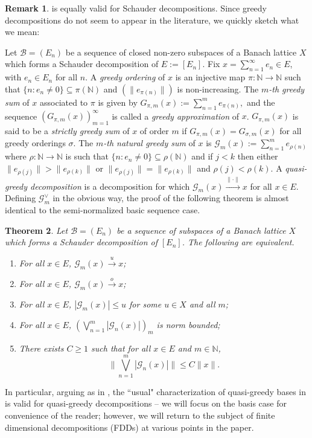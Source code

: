 \documentclass[12pt,leqno]{amsart}
\newtheorem{theorem}{Theorem}[section]
\numberwithin{equation}{section}
\theoremstyle{definition}
\newtheorem{remark}[theorem]{Remark}
\newcommand{\term}[1]{{\textit{#1}}}   %
\def\N{{\mathbb N}}
\begin{document}
\begin{remark}\label{Recall FDD}
  is equally valid for Schauder decompositions. Since greedy decompositions do not seem to appear in the literature, we quickly sketch what we mean:
\medskip

Let $\mathcal{B}=(E_n)$ be a sequence of closed non-zero subspaces of a Banach lattice $X$ which forms a Schauder  decomposition of $E:=[E_n].$  Fix $x=\sum_{n=1}^\infty e_n \in E$, with $e_n\in E_n$ for all $n$. A \term{greedy ordering} of $x$ is an injective map $\pi : \mathbb{N}\to \mathbb{N}$ such that $\{n: e_n\neq 0\}\subseteq \pi(\mathbb{N})$ and  $(\|e_{\pi(n)}\|)$ is non-increasing. The \term{$m$-th greedy sum} of $x$ associated to $\pi$ is given by $G_{\pi,m}(x):=\sum_{n=1}^m e_{\pi(n)},$
and the sequence $(G_{\pi,m}(x))_{m=1}^\infty$ is called a \term{greedy approximation} of $x$.  $G_{\pi,m}(x)$ is said to be a \term{strictly greedy sum} of $x$ of order $m$ if $G_{\pi,m}(x)=G_{\sigma,m}(x)$ for all greedy orderings $\sigma$.  The \term{$m$-th  natural greedy sum} of $x$ is $\mathcal{G}_m(x):=\sum_{n=1}^m e_{\rho(n)}$ where $\rho: \mathbb{N}\to \mathbb{N}$ is such that $\{n: e_n\neq 0\}\subseteq \rho(\mathbb{N})$ and if $j<k$ then either $\|e_{\rho(j)}\|>\|e_{\rho(k)}\|$ or $\|e_{\rho(j)}\|=\|e_{\rho(k)}\|$ and $\rho(j)<\rho(k)$. A \term{quasi-greedy decomposition} is a decomposition for which $\mathcal{G}_m(x)\xrightarrow{\|\cdot\|}x$ for all $x\in E$. Defining $\mathcal{G}_m^\vee$ in the obvious way, the proof of the following theorem is almost identical to the semi-normalized basic sequence case.
\end{remark}
\begin{theorem}\label{u-greedy theorem. decompo}
Let $\mathcal{B}=(E_n)$ be a sequence of subspaces of a Banach lattice $X$ which forms a Schauder decomposition of $[E_n]$.  The following are equivalent.
\begin{enumerate}
\item For all $x\in E$,  $\mathcal{G}_m(x)\xrightarrow{u}x$;
\item For all $x\in E$, $\mathcal{G}_m(x)\xrightarrow{o}x$;
\item For all $x\in E$, $|\mathcal{G}_m(x)|\leq u$ for some $u\in X$ and all $m$;
\item For all $x\in E$, $(\bigvee_{n=1}^m|\mathcal{G}_n(x)|)_{m}$ is norm bounded;
\item There exists $C\geq 1$ such that for all $x\in E$ and $m\in \N$,
$$\bigg\|\bigvee_{n=1}^m\left|\mathcal{G}_n(x)\right|\bigg\|\leq C\|x\|.$$
\end{enumerate}

\end{theorem}
In particular, arguing as in , the ``usual" characterization of quasi-greedy bases in  is valid for quasi-greedy decompositions -- we will focus on the basis case for convenience of the reader; however, we will return to the subject of finite dimensional decompositions (FDDs) at various points in the paper. 
\medskip
\end{document}
